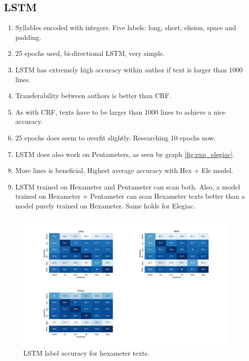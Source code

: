 \newpage
\subsection{LSTM}
\begin{enumerate}
  \item Syllables encoded with integers. Five labels: long, short, elision, space and padding.
	\item 25 epochs used, bi-directional LSTM, very simple.
	\item LSTM has extremely high accuracy within author if text is larger than 1000 lines.
	\item Transferability between authors is better than CRF.
	\item As with CRF, texts have to be larger than 1000 lines to achieve a nice accuracy.
    \item 25 epochs does seem to overfit slightly. Researching 10 epochs now.
    \item LSTM does also work on Pentameters, as seen by graph \ref{fig:exp_elegiac}.
    \item More lines is beneficial. Highest average accuracy with Hex + Ele model.
    \item LSTM trained on Hexameter and Pentameter can scan both. Also, a model trained on Hexameter + Pentameter can scan Hexameter texts better than a model purely trained on Hexameter. Same holds for Elegiac.
\end{enumerate}

\begin{figure}[H]
    \centering
    \includegraphics[width=1\textwidth]{img/lstm/lstm_hexameter_experiment.png}
    \caption{LSTM label accuracy for hexameter texts.}
    \label{fig:exp_architecture}
\end{figure}

